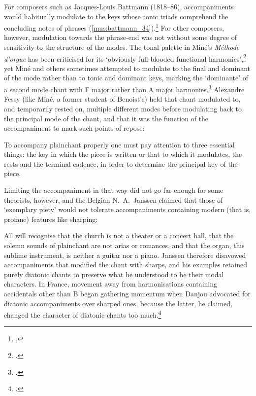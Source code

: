 For composers such as Jacques-Louis Battmann (1818--86), accompaniments would habitually modulate to the keys whose tonic triads comprehend the concluding notes of phrases (\cref{mus:battmann_34}).\footcite[34, 44]{BattmannCoursharmonietheorique1855}
For other composers, however, modulation towards the phrase-end was not without some degree of sensitivity to the structure of the modes.
The tonal palette in Miné's \emph{Méthode d'orgue} has been criticised for its `obviously full-blooded functional harmonies',\footcite[33]{ChristensenStoriesTonalityAge2019} yet Miné and others sometimes attempted to modulate to the final and dominant of the mode rather than to tonic and dominant keys, marking the `dominante' of a second mode chant with F major rather than A major harmonies.\footcite[30]{MineMethodeorgue1836}
%
Alexandre Fessy (like Miné, a former student of Benoist's) held that chant modulated to, and temporarily rested on, multiple different modes before modulating back to the principal mode of the chant, and that it was the function of the accompaniment to mark such points of repose:

  {\cite[10]{FessyManuelorguecontenant1845}}
{To accompany plainchant properly one must pay attention to three essential things: the key in which the piece is written or that to which it modulates, the rests and the terminal cadence, in order to determine the principal key of the piece.}

Limiting the accompaniment in that way did not go far enough for some theorists, however, and the Belgian N.~A.~Janssen claimed that those of `exemplary piety' would not tolerate accompaniments containing modern (that is, profane) features like sharping:

  {\cite[208]{Janssenvraisprincipeschant1845}}
{All will recognise that the church is not a theater or a concert hall, that the solemn sounds of plainchant are not arias or romances, and that the organ, this sublime instrument, is neither a guitar nor a piano.}
%
\noindent
Janssen therefore disavowed accompaniments that modified the chant with sharps, and his examples retained purely diatonic chants to preserve what he understood to be their modal characters.
In France, movement away from harmonisations containing accidentals other than B\kern 1pt\flat{} began gathering momentum when Danjou advocated for diatonic accompaniments over sharped ones, because the latter, he claimed, changed the character of diatonic chants too much.\footcite[408]{Danjouaccompagnementplainchant1847}
\nowidow[2]

